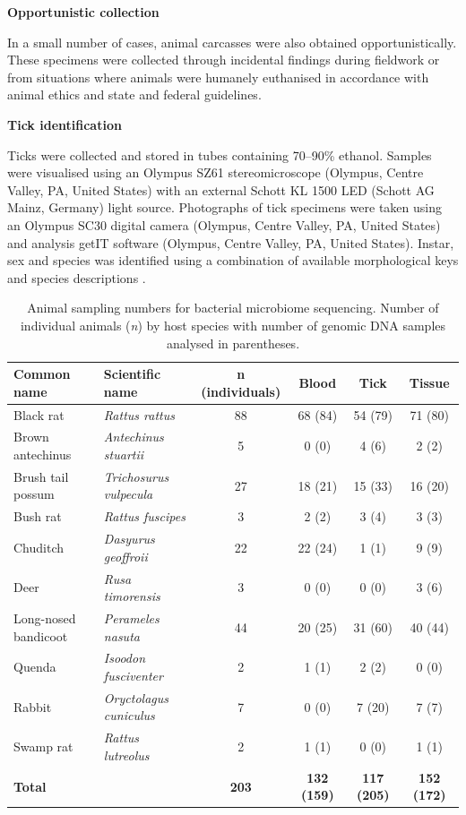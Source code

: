 \documentclass[a4paper, nobind]{templates/ociamthesis}
\begin{document}
\textbf{Opportunistic collection}

In a small number of cases, animal carcasses were also obtained opportunistically. These specimens were collected through incidental findings during fieldwork or from situations where animals were humanely euthanised in accordance with animal ethics and state and federal guidelines.

\textbf{Tick identification}

Ticks were collected and stored in tubes containing 70--90\% ethanol. Samples were visualised using an Olympus SZ61 stereomicroscope (Olympus, Centre Valley, PA, United States) with an external Schott KL 1500 LED (Schott AG Mainz, Germany) light source.
Photographs of tick specimens were taken using an Olympus SC30 digital camera (Olympus, Centre Valley, PA, United States) and analysis getIT software (Olympus, Centre Valley, PA, United States).
Instar, sex and species was identified using a combination of available morphological keys and species descriptions \autocite{robertsAustralianTicks1970,jacksonMorphologicalComparisonAdult2002,laanObservationsBiologyDistribution2011,barkerTicksAustraliaSpecies2014,kwakPhylogeneticAnalysisAustralian2017}.

\begin{table}

\caption[Host sample numbers for bacterial microbiome study.]{\label{tab:T3hosts}Animal sampling numbers for bacterial microbiome sequencing. Number of individual animals (\textit{n}) by host species with number of genomic DNA samples analysed in parentheses.}
\centering
\fontsize{8.5}{10.5}\selectfont
\begin{tabular}[t]{l>{}lcccc}
\toprule
Common name & Scientific name & n (individuals) & Blood & Tick & Tissue\\
\midrule
Black rat & \em{Rattus rattus} & 88 & 68 (84) & 54 (79) & 71 (80)\\
Brown antechinus & \em{Antechinus stuartii} & 5 & 0 (0) & 4 (6) & 2 (2)\\
Brush tail possum & \em{Trichosurus vulpecula} & 27 & 18 (21) & 15 (33) & 16 (20)\\
Bush rat & \em{Rattus fuscipes} & 3 & 2 (2) & 3 (4) & 3 (3)\\
Chuditch & \em{Dasyurus geoffroii} & 22 & 22 (24) & 1 (1) & 9 (9)\\
Deer & \em{Rusa timorensis} & 3 & 0 (0) & 0 (0) & 3 (6)\\
Long-nosed bandicoot & \em{Perameles nasuta} & 44 & 20 (25) & 31 (60) & 40 (44)\\
Quenda & \em{Isoodon fusciventer} & 2 & 1 (1) & 2 (2) & 0 (0)\\
Rabbit & \em{Oryctolagus cuniculus} & 7 & 0 (0) & 7 (20) & 7 (7)\\
Swamp rat & \em{Rattus lutreolus} & 2 & 1 (1) & 0 (0) & 1 (1)\\
\textbf{Total} & \em{\textbf{}} & \textbf{203} & \textbf{132 (159)} & \textbf{117 (205)} & \textbf{152 (172)}\\
\bottomrule
\end{tabular}
\end{table}
\end{document}
